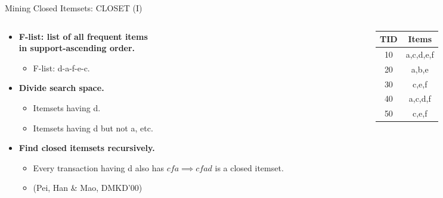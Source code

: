 \begin{frame}{Mining Closed Itemsets: CLOSET (I)}
	\begin{columns}[c]
		\begin{column}{0.6\textwidth}
			\begin{itemize}
				\item \textbf{F-list: list of all frequent items \\ in
					      support-ascending order.}
				      \begin{itemize}
					      \item F-list: d-a-f-e-c.
				      \end{itemize}
				\item \textbf{Divide search space.}
				      \begin{itemize}
					      \item Itemsets having d.
					      \item Itemsets having d but not a, etc.
				      \end{itemize}
				\item \textbf{Find closed itemsets recursively.}
				      \begin{itemize}
					      \item Every transaction having d also has $cfa \implies
						            cfad$ is a closed itemset.
					      \item (Pei, Han \& Mao, DMKD'00)
				      \end{itemize}
			\end{itemize}
		\end{column}
		\begin{column}{0.25\textwidth}
			\begin{tabular}{|c|c|}
				\hline
				TID & Items     \\\hline
				10  & a,c,d,e,f \\\hline
				20  & a,b,e     \\\hline
				30  & c,e,f     \\\hline
				40  & a,c,d,f   \\\hline
				50  & c,e,f     \\\hline
			\end{tabular}
		\end{column}
	\end{columns}
\end{frame}

